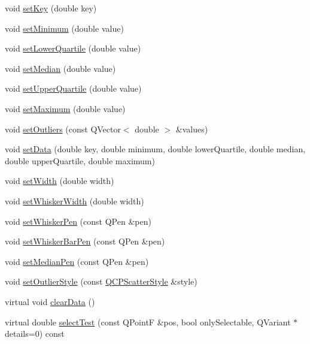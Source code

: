 \begin{DoxyCompactItemize}
\item 
void \hyperlink{class_q_c_p_statistical_box_a84a1c6d34b2f9af40bca0c527d51e97e}{set\+Key} (double key)
\item 
void \hyperlink{class_q_c_p_statistical_box_a84ff7cc61ba44890f0c3e0c99c19941e}{set\+Minimum} (double value)
\item 
void \hyperlink{class_q_c_p_statistical_box_a680941af5e23d902013962fa67223f9e}{set\+Lower\+Quartile} (double value)
\item 
void \hyperlink{class_q_c_p_statistical_box_a65970e77a897da4ecb4b15300868aad3}{set\+Median} (double value)
\item 
void \hyperlink{class_q_c_p_statistical_box_a65a1375f941c5a2077b5201229e89346}{set\+Upper\+Quartile} (double value)
\item 
void \hyperlink{class_q_c_p_statistical_box_acec5ad1901f00f2c5387cfb4d9787eb3}{set\+Maximum} (double value)
\item 
void \hyperlink{class_q_c_p_statistical_box_af9bc09620e0bf93bf444ee35e5800d1d}{set\+Outliers} (const Q\+Vector$<$ double $>$ \&values)
\item 
void \hyperlink{class_q_c_p_statistical_box_adf50c57b635edb12470c0e4a986aff37}{set\+Data} (double key, double minimum, double lower\+Quartile, double median, double upper\+Quartile, double maximum)
\item 
void \hyperlink{class_q_c_p_statistical_box_a0b62775bd67301b1eba5c785f2b26f14}{set\+Width} (double width)
\item 
void \hyperlink{class_q_c_p_statistical_box_adf378812446bd66f34d1f7f293d991cd}{set\+Whisker\+Width} (double width)
\item 
void \hyperlink{class_q_c_p_statistical_box_a4a5034cb3b9b040444df05ab1684620b}{set\+Whisker\+Pen} (const Q\+Pen \&pen)
\item 
void \hyperlink{class_q_c_p_statistical_box_aa8d3e503897788e1abf68dc74b5f147f}{set\+Whisker\+Bar\+Pen} (const Q\+Pen \&pen)
\item 
void \hyperlink{class_q_c_p_statistical_box_a7260ac55b669f5d0a74f16d5ca84c52c}{set\+Median\+Pen} (const Q\+Pen \&pen)
\item 
void \hyperlink{class_q_c_p_statistical_box_ad5241943422eb8e58360a97e99ad6aa7}{set\+Outlier\+Style} (const \hyperlink{class_q_c_p_scatter_style}{Q\+C\+P\+Scatter\+Style} \&style)
\item 
virtual void \hyperlink{class_q_c_p_statistical_box_a19112994449df0c20287858436cc68e3}{clear\+Data} ()
\item 
virtual double \hyperlink{class_q_c_p_statistical_box_a7d3ac843dc48a085740fdfc4319a89cc}{select\+Test} (const Q\+PointF \&pos, bool only\+Selectable, Q\+Variant $\ast$details=0) const 
\end{DoxyCompactItemize}
